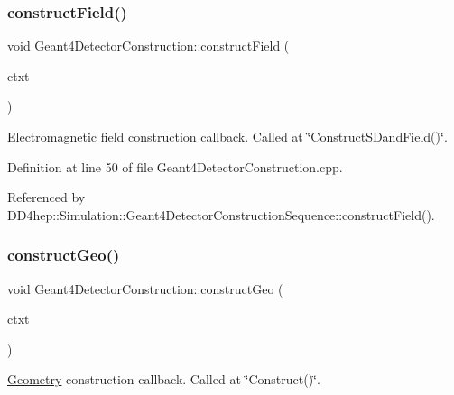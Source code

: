 \subsubsection{\texorpdfstring{construct\+Field()}{constructField()}}
{\footnotesize\ttfamily void Geant4\+Detector\+Construction\+::construct\+Field (\begin{DoxyParamCaption}\item[{\hyperlink{class_d_d4hep_1_1_simulation_1_1_geant4_detector_construction_context}{Geant4\+Detector\+Construction\+Context} $\ast$}]{ctxt }\end{DoxyParamCaption})\hspace{0.3cm}{\ttfamily [virtual]}}



Electromagnetic field construction callback. Called at \char`\"{}\+Construct\+S\+Dand\+Field()\char`\"{}. 



Definition at line 50 of file Geant4\+Detector\+Construction.\+cpp.



Referenced by D\+D4hep\+::\+Simulation\+::\+Geant4\+Detector\+Construction\+Sequence\+::construct\+Field().

\hypertarget{class_d_d4hep_1_1_simulation_1_1_geant4_detector_construction_a91ab552e6ee76df9e0ebff3351863ebd}{}\label{class_d_d4hep_1_1_simulation_1_1_geant4_detector_construction_a91ab552e6ee76df9e0ebff3351863ebd} 
\subsubsection{\texorpdfstring{construct\+Geo()}{constructGeo()}}
{\footnotesize\ttfamily void Geant4\+Detector\+Construction\+::construct\+Geo (\begin{DoxyParamCaption}\item[{\hyperlink{class_d_d4hep_1_1_simulation_1_1_geant4_detector_construction_context}{Geant4\+Detector\+Construction\+Context} $\ast$}]{ctxt }\end{DoxyParamCaption})\hspace{0.3cm}{\ttfamily [virtual]}}



\hyperlink{namespace_d_d4hep_1_1_geometry}{Geometry} construction callback. Called at \char`\"{}\+Construct()\char`\"{}. 



